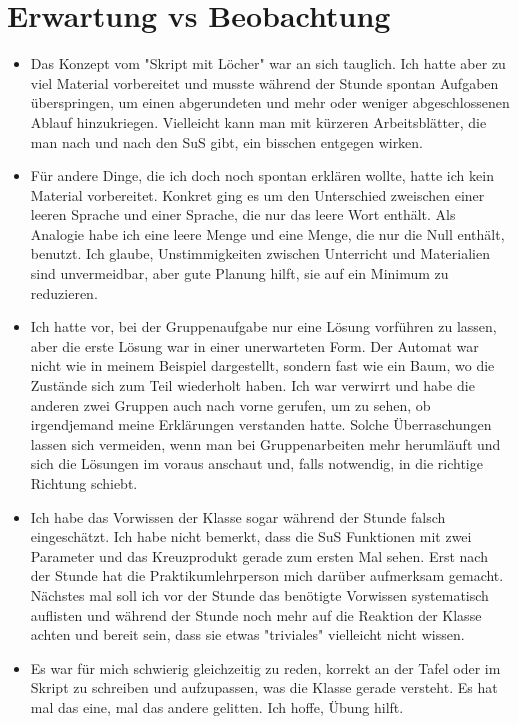 \documentclass{article}
\begin{document}
\section*{Erwartung vs Beobachtung}
\begin{itemize}
\item Das Konzept vom "Skript mit Löcher" war an sich tauglich. Ich hatte aber zu viel Material vorbereitet und musste während der Stunde spontan Aufgaben überspringen, um einen abgerundeten und mehr oder weniger abgeschlossenen Ablauf hinzukriegen. Vielleicht kann man mit kürzeren Arbeitsblätter, die man nach und nach den SuS gibt, ein bisschen entgegen wirken.

\item Für andere Dinge, die ich doch noch spontan erklären wollte, hatte ich kein Material vorbereitet. Konkret ging es um den Unterschied zweischen einer leeren Sprache und einer Sprache, die nur das leere Wort enthält. Als Analogie habe ich eine leere Menge und eine Menge, die nur die Null enthält, benutzt. Ich glaube, Unstimmigkeiten zwischen Unterricht und Materialien sind unvermeidbar, aber gute Planung hilft, sie auf ein Minimum zu reduzieren.

\item Ich hatte vor, bei der Gruppenaufgabe nur eine Lösung vorführen zu lassen, aber die erste Lösung war in einer unerwarteten Form. Der Automat war nicht wie in meinem Beispiel dargestellt, sondern fast wie ein Baum, wo die Zustände sich zum Teil wiederholt haben. Ich war verwirrt und habe die anderen zwei Gruppen auch nach vorne gerufen, um zu sehen, ob irgendjemand meine Erklärungen verstanden hatte. Solche Überraschungen lassen sich vermeiden, wenn man bei Gruppenarbeiten mehr herumläuft und sich die Lösungen im voraus anschaut und, falls notwendig, in die richtige Richtung schiebt.

\item Ich habe das Vorwissen der Klasse sogar während der Stunde falsch eingeschätzt. Ich habe nicht bemerkt, dass die SuS Funktionen mit zwei Parameter und das Kreuzprodukt gerade zum ersten Mal sehen. Erst nach der Stunde hat die Praktikumlehrperson mich darüber aufmerksam gemacht. Nächstes mal soll ich vor der Stunde das benötigte Vorwissen systematisch auflisten und während der Stunde noch mehr auf die Reaktion der Klasse achten und bereit sein, dass sie etwas "triviales" vielleicht nicht wissen. 

\item Es war für mich schwierig gleichzeitig zu reden, korrekt an der Tafel oder im Skript zu schreiben und aufzupassen, was die Klasse gerade versteht. Es hat mal das eine, mal das andere gelitten. Ich hoffe, Übung hilft.
\end{itemize}
\end{document}
